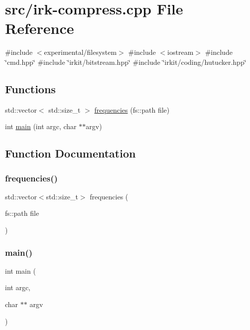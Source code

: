 \hypertarget{irk-compress_8cpp}{}\section{src/irk-\/compress.cpp File Reference}
\label{irk-compress_8cpp}
{\ttfamily \#include $<$experimental/filesystem$>$}\newline
{\ttfamily \#include $<$iostream$>$}\newline
{\ttfamily \#include \char`\"{}cmd.\+hpp\char`\"{}}\newline
{\ttfamily \#include \char`\"{}irkit/bitstream.\+hpp\char`\"{}}\newline
{\ttfamily \#include \char`\"{}irkit/coding/hutucker.\+hpp\char`\"{}}\newline
\subsection*{Functions}
\begin{DoxyCompactItemize}
\item 
std\+::vector$<$ std\+::size\+\_\+t $>$ \mbox{\hyperlink{irk-compress_8cpp_a2cd80733ced3d7eda8a6de0389cccc73}{frequencies}} (fs\+::path file)
\item 
int \mbox{\hyperlink{irk-compress_8cpp_a3c04138a5bfe5d72780bb7e82a18e627}{main}} (int argc, char $\ast$$\ast$argv)
\end{DoxyCompactItemize}


\subsection{Function Documentation}
\mbox{\label{irk-compress_8cpp_a2cd80733ced3d7eda8a6de0389cccc73}} 
\subsubsection{\texorpdfstring{frequencies()}{frequencies()}}
{\footnotesize\ttfamily std\+::vector$<$std\+::size\+\_\+t$>$ frequencies (\begin{DoxyParamCaption}\item[{fs\+::path}]{file }\end{DoxyParamCaption})}

\mbox{\label{irk-compress_8cpp_a3c04138a5bfe5d72780bb7e82a18e627}} 
\subsubsection{\texorpdfstring{main()}{main()}}
{\footnotesize\ttfamily int main (\begin{DoxyParamCaption}\item[{int}]{argc,  }\item[{char $\ast$$\ast$}]{argv }\end{DoxyParamCaption})}

